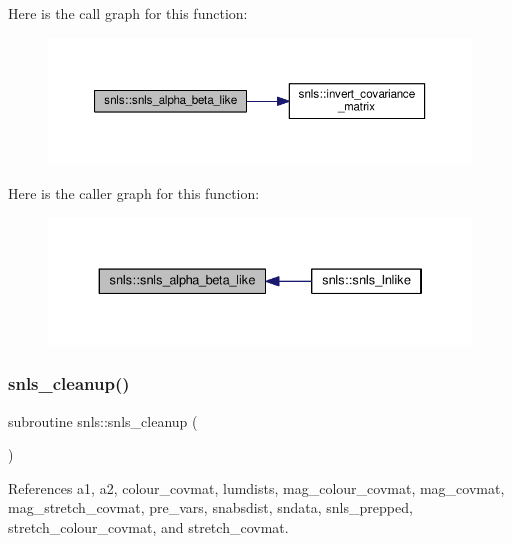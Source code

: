 Here is the call graph for this function\+:
\nopagebreak
\begin{figure}[H]
\begin{center}
\leavevmode
\includegraphics[width=350pt]{namespacesnls_a31b64210643b2a6f625a1925f01c1194_cgraph}
\end{center}
\end{figure}
Here is the caller graph for this function\+:
\nopagebreak
\begin{figure}[H]
\begin{center}
\leavevmode
\includegraphics[width=334pt]{namespacesnls_a31b64210643b2a6f625a1925f01c1194_icgraph}
\end{center}
\end{figure}
\mbox{\label{namespacesnls_aceae969ecb486792f081d6533244fd09}} 
\subsubsection{\texorpdfstring{snls\+\_\+cleanup()}{snls\_cleanup()}}
{\footnotesize\ttfamily subroutine snls\+::snls\+\_\+cleanup (\begin{DoxyParamCaption}{ }\end{DoxyParamCaption})\hspace{0.3cm}{\ttfamily [private]}}



References a1, a2, colour\+\_\+covmat, lumdists, mag\+\_\+colour\+\_\+covmat, mag\+\_\+covmat, mag\+\_\+stretch\+\_\+covmat, pre\+\_\+vars, snabsdist, sndata, snls\+\_\+prepped, stretch\+\_\+colour\+\_\+covmat, and stretch\+\_\+covmat.

